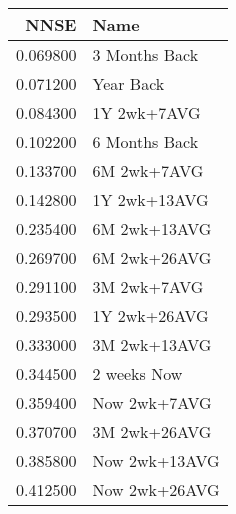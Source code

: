 \begin{tabular}{rl}
NNSE & Name \\
\hline
0.069800 & 3 Months Back \\
0.071200 & Year Back \\
0.084300 & 1Y 2wk+7AVG \\
0.102200 & 6 Months Back \\
0.133700 & 6M 2wk+7AVG \\
0.142800 & 1Y 2wk+13AVG \\
0.235400 & 6M 2wk+13AVG \\
0.269700 & 6M 2wk+26AVG \\
0.291100 & 3M 2wk+7AVG \\
0.293500 & 1Y 2wk+26AVG \\
0.333000 & 3M 2wk+13AVG \\
0.344500 & 2 weeks Now \\
0.359400 & Now 2wk+7AVG \\
0.370700 & 3M 2wk+26AVG \\
0.385800 & Now 2wk+13AVG \\
0.412500 & Now 2wk+26AVG \\
\hline
\end{tabular}